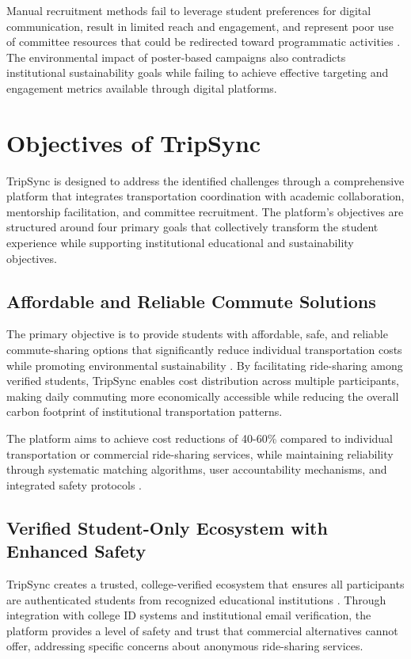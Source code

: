 \documentclass[conference]{IEEEtran}
\begin{document}
Manual recruitment methods fail to leverage student preferences for digital communication, result in limited reach and engagement, and represent poor use of committee resources that could be redirected toward programmatic activities \cite{ref5}. The environmental impact of poster-based campaigns also contradicts institutional sustainability goals while failing to achieve effective targeting and engagement metrics available through digital platforms.

\section{Objectives of TripSync}

TripSync is designed to address the identified challenges through a comprehensive platform that integrates transportation coordination with academic collaboration, mentorship facilitation, and committee recruitment. The platform's objectives are structured around four primary goals that collectively transform the student experience while supporting institutional educational and sustainability objectives.

\subsection{Affordable and Reliable Commute Solutions}

The primary objective is to provide students with affordable, safe, and reliable commute-sharing options that significantly reduce individual transportation costs while promoting environmental sustainability \cite{ref6}\cite{ref7}. By facilitating ride-sharing among verified students, TripSync enables cost distribution across multiple participants, making daily commuting more economically accessible while reducing the overall carbon footprint of institutional transportation patterns.

The platform aims to achieve cost reductions of 40-60\% compared to individual transportation or commercial ride-sharing services, while maintaining reliability through systematic matching algorithms, user accountability mechanisms, and integrated safety protocols \cite{ref8}\cite{ref9}.

\subsection{Verified Student-Only Ecosystem with Enhanced Safety}

TripSync creates a trusted, college-verified ecosystem that ensures all participants are authenticated students from recognized educational institutions \cite{ref10}\cite{ref11}. Through integration with college ID systems and institutional email verification, the platform provides a level of safety and trust that commercial alternatives cannot offer, addressing specific concerns about anonymous ride-sharing services.
\end{document}

